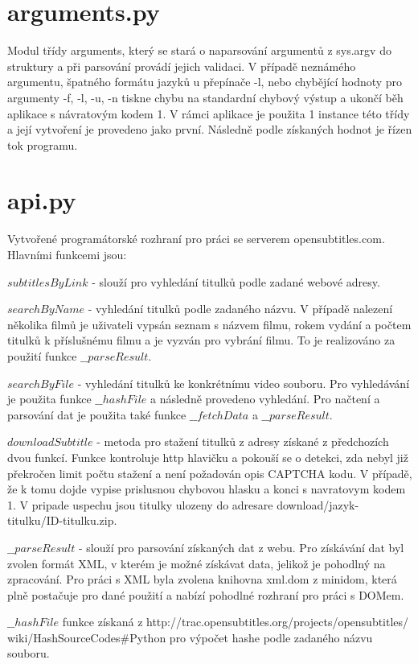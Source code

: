 \documentclass[a4paper,12]{article}
\begin{document}
\section*{arguments.py}
Modul třídy arguments, který se stará o naparsování argumentů z sys.argv do struktury a při parsování provádí jejich validaci. V případě neznámého argumentu, špatného formátu jazyků u přepínače -l, nebo chybějící hodnoty pro argumenty -f, -l, -u, -n tiskne chybu na standardní chybový výstup a ukončí běh aplikace s návratovým kodem 1.
V rámci aplikace je použita 1 instance této třídy a její vytvoření je provedeno jako první. Následně podle získaných hodnot je řízen tok programu.

\section*{api.py}
Vytvořené programátorské rozhraní pro práci se serverem opensubtitles.com. Hlavními funkcemi jsou:

$subtitlesByLink$ - slouží pro vyhledání titulků podle zadané webové adresy.

$searchByName$ - vyhledání titulků podle zadaného názvu. V případě nalezení několika filmů je uživateli vypsán seznam s názvem filmu, rokem vydání a počtem titulků k příslušnému filmu a je vyzván pro vybrání filmu. To je realizováno za použití funkce $\_\_parseResult$.

$searchByFile$ - vyhledání titulků ke konkrétnímu video souboru. Pro vyhledávání je použita funkce $\_\_hashFile$ a následně provedeno vyhledání. Pro načtení a parsování dat je použita také funkce $\_\_fetchData$ a $\_\_parseResult$.

$downloadSubtitle$ - metoda pro stažení titulků z adresy získané z předchozích dvou funkcí. Funkce kontroluje http hlavičku a pokouší se o detekci, zda nebyl již překročen limit počtu stažení a není požadován opis CAPTCHA kodu. V případě, že k tomu dojde vypise prislusnou chybovou hlasku a konci s navratovym kodem 1. V pripade uspechu jsou titulky ulozeny do adresare download/jazyk-titulku/ID-titulku.zip.

$\_\_parseResult$ - slouží pro parsování získaných dat z webu. Pro získávání dat byl zvolen formát XML, v kterém je možné získávat data, jelikož je pohodlný na zpracování. Pro práci s XML byla zvolena knihovna xml.dom z minidom, která plně postačuje pro dané použití a nabízí pohodlné rozhraní pro práci s DOMem.

$\_\_hashFile$ funkce získaná z http://trac.opensubtitles.org/projects/opensubtitles/
wiki/HashSourceCodes\#Python pro výpočet hashe podle zadaného názvu souboru.
\end{document}
